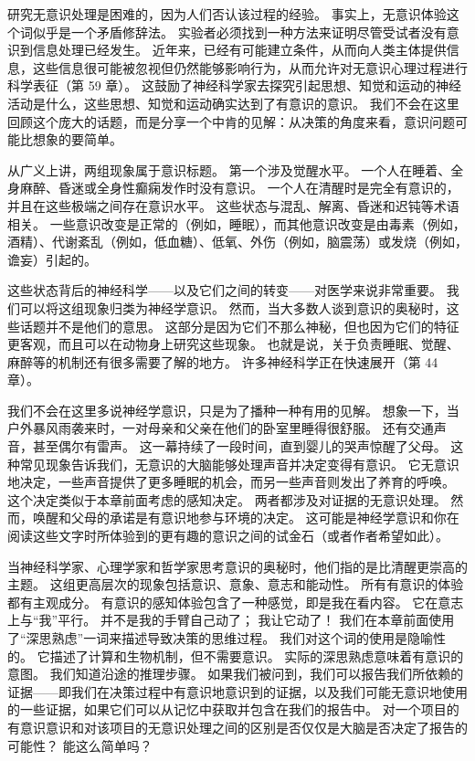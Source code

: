 研究无意识处理是困难的，因为人们否认该过程的经验。 事实上，无意识体验这个词似乎是一个矛盾修辞法。 实验者必须找到一种方法来证明尽管受试者没有意识到信息处理已经发生。 近年来，已经有可能建立条件，从而向人类主体提供信息，这些信息很可能被忽视但仍然能够影响行为，从而允许对无意识心理过程进行科学表征（第 59 章）。 这鼓励了神经科学家去探究引起思想、知觉和运动的神经活动是什么，这些思想、知觉和运动确实达到了有意识的意识。 我们不会在这里回顾这个庞大的话题，而是分享一个中肯的见解：从决策的角度来看，意识问题可能比想象的要简单。

从广义上讲，两组现象属于意识标题。 第一个涉及觉醒水平。 一个人在睡着、全身麻醉、昏迷或全身性癫痫发作时没有意识。 一个人在清醒时是完全有意识的，并且在这些极端之间存在意识水平。 这些状态与混乱、解离、昏迷和迟钝等术语相关。 一些意识改变是正常的（例如，睡眠），而其他意识改变是由毒素（例如，酒精）、代谢紊乱（例如，低血糖）、低氧、外伤（例如，脑震荡）或发烧（例如，谵妄）引起的。

这些状态背后的神经科学——以及它们之间的转变——对医学来说非常重要。 我们可以将这组现象归类为神经学意识。 然而，当大多数人谈到意识的奥秘时，这些话题并不是他们的意思。 这部分是因为它们不那么神秘，但也因为它们的特征更客观，而且可以在动物身上研究这些现象。 也就是说，关于负责睡眠、觉醒、麻醉等的机制还有很多需要了解的地方。 许多神经科学正在快速展开（第 44 章）。

我们不会在这里多说神经学意识，只是为了播种一种有用的见解。 想象一下，当户外暴风雨袭来时，一对母亲和父亲在他们的卧室里睡得很舒服。 还有交通声音，甚至偶尔有雷声。 这一幕持续了一段时间，直到婴儿的哭声惊醒了父母。 这种常见现象告诉我们，无意识的大脑能够处理声音并决定变得有意识。 它无意识地决定，一些声音提供了更多睡眠的机会，而另一些声音则发出了养育的呼唤。 这个决定类似于本章前面考虑的感知决定。 两者都涉及对证据的无意识处理。 然而，唤醒和父母的承诺是有意识地参与环境的决定。 这可能是神经学意识和你在阅读这些文字时所体验到的更有趣的意识之间的试金石（或者作者希望如此）。

当神经科学家、心理学家和哲学家思考意识的奥秘时，他们指的是比清醒更崇高的主题。 这组更高层次的现象包括意识、意象、意志和能动性。 所有有意识的体验都有主观成分。 有意识的感知体验包含了一种感觉，即是我在看内容。 它在意志上与“我”平行。 并不是我的手臂自己动了； 我让它动了！ 我们在本章前面使用了“深思熟虑”一词来描述导致决策的思维过程。 我们对这个词的使用是隐喻性的。 它描述了计算和生物机制，但不需要意识。 实际的深思熟虑意味着有意识的意图。 我们知道沿途的推理步骤。 如果我们被问到，我们可以报告我们所依赖的证据——即我们在决策过程中有意识地意识到的证据，以及我们可能无意识地使用的一些证据，如果它们可以从记忆中获取并包含在我们的报告中。 对一个项目的有意识意识和对该项目的无意识处理之间的区别是否仅仅是大脑是否决定了报告的可能性？ 能这么简单吗？

